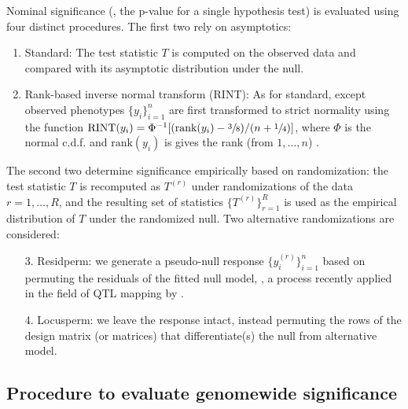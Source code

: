   Nominal significance (\ie, the p-value for a single hypothesis test) is evaluated using four distinct procedures. The first two rely on asymptotics:
  \begin{enumerate}
      \item Standard: The test statistic $T$ is computed on the observed data and compared with its asymptotic distribution under the null.
      \item Rank-based inverse normal transform (RINT): As for standard, except observed phenotypes $\{y_i\}_{i=1}^n$ are first transformed to strict normality using the function $\text{RINT}(y_i)=\Phi^{-1}[(\text{rank}(y_i) - \sfrac{3}{8})/(n+\sfrac{1}{4})]$, where $\Phi$ is the normal c.d.f. and $\text{rank}(y_i)$ is gives the rank (from $1,\dots,n$) \citep{Beasley2009}.
  \end{enumerate}
  The second two determine significance empirically based on randomization: the test statistic $T$ is recomputed as $T^{(r)}$ under randomizations of the data $r=1,\dots,R$, and the resulting set of statistics $\{T^{(r)}\}_{r=1}^R$ is used as the empirical distribution of $T$ under the randomized null.
  Two alternative randomizations are considered:
  \begin{enumerate}
      \item[3.] Residperm: we generate a pseudo-null response $\{y^{(r)}_i\}_{i=1}^n$ based on permuting the residuals of the fitted null model, \citep{Freedman1983,good2013permutation}, a process recently applied in the field of QTL mapping by \cite{Cao2014}.
      \item[4.] Locusperm: we leave the response intact, instead permuting the rows of the design matrix (or matrices) that differentiate(s) the null from alternative model.
  \end{enumerate}

\subsection{Procedure to evaluate genomewide significance}

